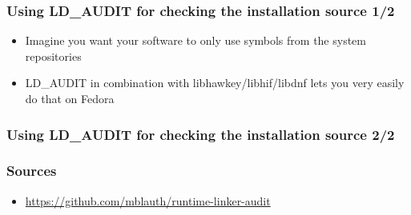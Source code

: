\documentclass{beamer}
\begin{document}
\begin{frame}
  \frametitle{Using LD\_AUDIT for checking the installation source 1/2}
  \begin{itemize}
    \item Imagine you want your software to only use symbols from the system repositories
    \item LD\_AUDIT in combination with libhawkey/libhif/libdnf lets you very easily do that on Fedora
  \end{itemize}
\end{frame}

\begin{frame}
  \frametitle{Using LD\_AUDIT for checking the installation source 2/2}


\end{frame}

\begin{frame}
  \frametitle{Sources}
  \begin{itemize}
    \item \url{https://github.com/mblauth/runtime-linker-audit}
  \end{itemize}
\end{frame}
\end{document}
